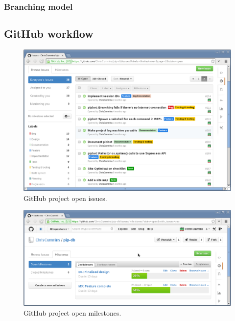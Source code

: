 \subsubsection{Branching model}

\cite{driessen2012successful}

\subsection{GitHub workflow}\label{subsec:github-workflow}





\begin{figure}[H]
\centering
    \includegraphics[width=\textwidth]{assets/github-issues}
\caption[GitHub project open issues]
        {GitHub project open issues.}
\label{fig:github-issues}
\end{figure}




\begin{figure}[H]
\centering
    \includegraphics[width=\textwidth]{assets/github-milestones}
\caption[GitHub project open milestones]
        {GitHub project open milestones.}
\label{fig:github-milestones}
\end{figure}



